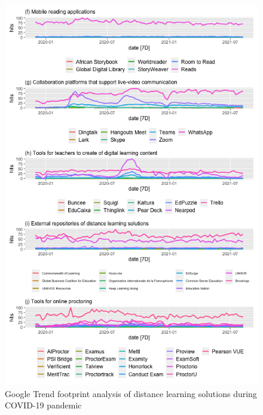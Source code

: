\documentclass[11pt,a4paper,]{article}
\begin{document}
\begin{figure}[h]

{\centering \includegraphics[width=1\textwidth]{figure/plot2-1} 

}

\caption{Google Trend footprint analysis of distance learning solutions during COVID-19 pandemic}\label{fig:plot2}
\end{figure}
\end{document}
